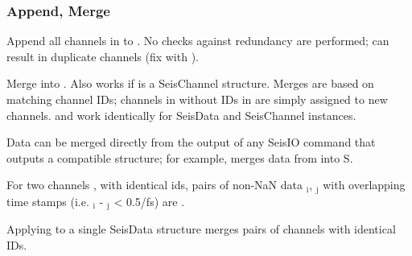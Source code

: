 \documentclass[letterpaper,11pt,english]{sphinxmanual}
\begin{document}
\subsubsection{Append, Merge}
\label{\detokenize{src/seisdata:append-merge}}

\begin{fulllineitems}
\end{fulllineitems}


Append all channels in  to . No checks against redundancy are performed; can result in duplicate channels (fix with ).


\begin{fulllineitems}
\end{fulllineitems}



\begin{fulllineitems}
\end{fulllineitems}


Merge  into . Also works if  is a SeisChannel structure. Merges are based on matching channel IDs; channels in  without IDs in  are simply assigned to new channels.  and \sphinxstylestrong{+=} work identically for SeisData and SeisChannel instances.

Data can be merged directly from the output of any SeisIO command that outputs a compatible structure; for example,  merges data from  into S.

For two channels ,  with identical ids, pairs of non-NaN data $_{\text{i}}$, $_{\text{j}}$ with overlapping time stamps (i.e. \textbar{} $_{\text{i}}$ - $_{\text{j}}$ \textbar{} \textless{} 0.5/fs) are .


\begin{fulllineitems}
\end{fulllineitems}


Applying  to a single SeisData structure merges pairs of channels with identical IDs.
\end{document}
